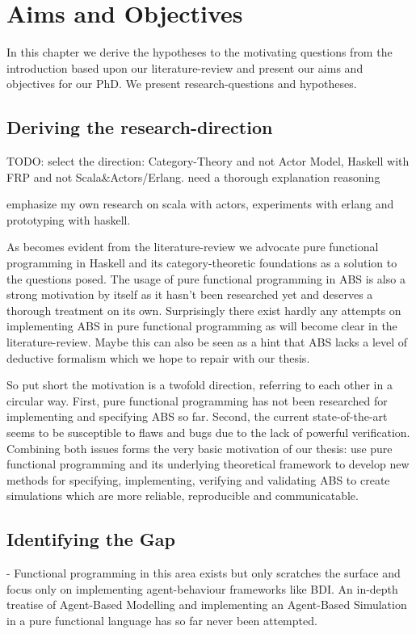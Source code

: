 \chapter{Aims and Objectives}
In this chapter we derive the hypotheses to the motivating questions from the introduction based upon our literature-review and present our aims and objectives for our PhD. We present research-questions and hypotheses.

\section{Deriving the research-direction}
TODO: select the direction: Category-Theory and not Actor Model, Haskell with FRP and not Scala\&Actors/Erlang. need a thorough explanation reasoning

emphasize my own research on scala with actors, experiments with erlang and prototyping with haskell.

As becomes evident from the literature-review we advocate pure functional programming in Haskell and its category-theoretic foundations as a solution to the questions posed. The usage of pure functional programming in ABS is also a strong motivation by itself as it hasn't been researched yet and deserves a thorough treatment on its own. Surprisingly there exist hardly any attempts on implementing ABS in pure functional programming as will become clear in the literature-review. Maybe this can also be seen as a hint that ABS lacks a level of deductive formalism which we hope to repair with our thesis. 

So put short the motivation is a twofold direction, referring to each other in a circular way. First, pure functional programming has not been researched for implementing and specifying ABS so far. Second,  the current state-of-the-art seems to be susceptible to flaws and bugs due to the lack of powerful verification. Combining both issues forms the very basic motivation of our thesis: use pure functional programming and its underlying theoretical framework to develop new methods for specifying, implementing, verifying and validating ABS to create simulations which are more reliable, reproducible and communicatable.

\section{Identifying the Gap}
- Functional programming in this area exists but only scratches the surface and focus only on implementing agent-behaviour frameworks like BDI. An in-depth treatise of Agent-Based Modelling and implementing an Agent-Based Simulation in a pure functional language has so far never been attempted.

